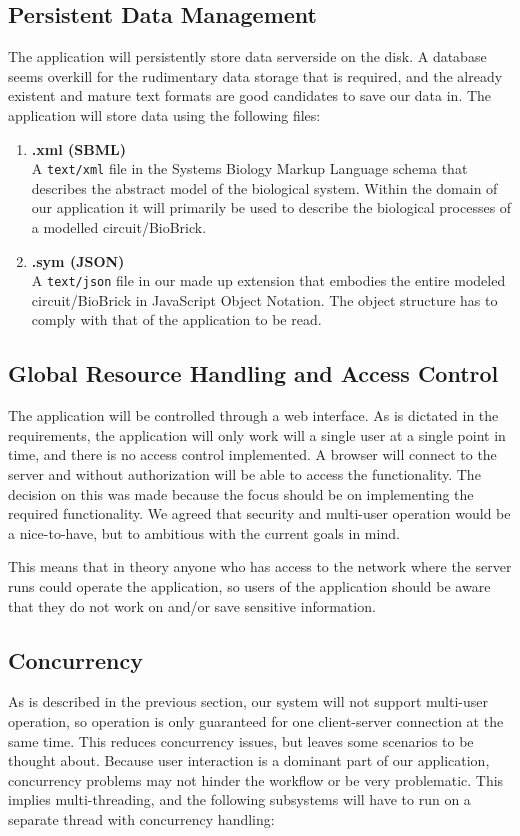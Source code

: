 \subsection{Persistent Data Management}
\label{ss-persitance}
The application will persistently store data serverside on the disk. A database seems overkill for the rudimentary data storage that is required, and the already existent and mature text formats are good candidates to save our data in. The application will store data using the following files:
\begin{enumerate}
\item \textbf{.xml (SBML)} \\
A \verb=text/xml= file in the Systems Biology Markup Language schema that describes the abstract model of the biological system. Within the domain of our application it will primarily be used to describe the biological processes of a modelled circuit/BioBrick.

\item \textbf{.sym (JSON)} \\
A \verb=text/json= file in our made up extension
that embodies the entire modeled circuit/BioBrick in JavaScript Object Notation. The object structure has to comply with that of the application to be read.\end{enumerate}

\subsection{Global Resource Handling and Access Control}
The application will be controlled through a web interface. As is dictated in the requirements, the application will only work will a single user at a single point in time, and there is no access control implemented. A browser will connect to the server and without authorization will be able to access the functionality. The decision on this was made because the focus should be on implementing the required functionality. We agreed that security and multi-user operation would be a nice-to-have, but to ambitious with the current goals in mind.

This means that in theory anyone who has access to the network where the server runs could operate the application, so users of the application should be aware that they do not work on and/or save sensitive information.

\subsection{Concurrency}
As is described in the previous section, our system will not support multi-user operation, so operation is only guaranteed for one client-server connection at the same time. This reduces concurrency issues, but leaves some scenarios to be thought about. Because user interaction is a dominant part of our application, concurrency problems may not hinder the workflow or be very problematic. This implies multi-threading, and the following subsystems will have to run on a separate thread with concurrency handling:

